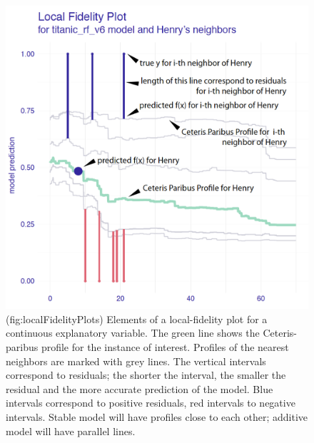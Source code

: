\documentclass[12pt,]{krantz}
\theoremstyle{definition}
\theoremstyle{definition}
\theoremstyle{definition}
\theoremstyle{remark}
\begin{document}
\begin{figure}

{\centering \includegraphics[width=0.7\linewidth]{figure/localFidelityPlots} 

}

\caption{(fig:localFidelityPlots) Elements of a local-fidelity plot for a continuous explanatory variable. The green line shows the Ceteris-paribus profile for the instance of interest. Profiles of the nearest neighbors are marked with grey lines. The vertical intervals correspond to residuals; the shorter the interval, the smaller the residual and the more accurate prediction of the model. Blue intervals correspond to positive residuals, red intervals to negative intervals. Stable model will have profiles close to each other; additive model will have parallel lines.}\label{fig:localFidelityPlots}
\end{figure}
\end{document}
